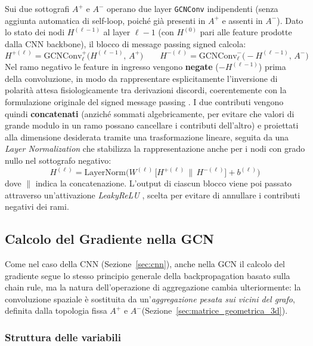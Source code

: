 Sui due sottografi $A^+$ e $A^-$ operano due layer \texttt{GCNConv} \cite{kipfwelling2017} indipendenti (senza aggiunta automatica di self-loop, poiché già presenti in $A^+$ e assenti in $A^-$). Dato lo stato dei nodi $H^{(\ell-1)}$ al layer $\ell-1$ (con $H^{(0)}$ pari alle feature prodotte dalla CNN backbone), il blocco di message passing signed calcola:
\begin{equation}
	H^{+(\ell)} = \text{GCNConv}^+_\ell\big(H^{(\ell-1)},\, A^+\big)
	\qquad
	H^{-(\ell)} = \text{GCNConv}^-_\ell\big(-H^{(\ell-1)},\, A^-\big)
\end{equation}
Nel ramo negativo le feature in ingresso vengono \textbf{negate} ($-H^{(\ell-1)}$) prima della convoluzione, in modo da rappresentare esplicitamente l'inversione di polarità attesa fisiologicamente tra derivazioni discordi, coerentemente con la formulazione originale del signed message passing \cite{derr2018signed}. I due contributi vengono quindi \textbf{concatenati} (anziché sommati algebricamente, per evitare che valori di grande modulo in un ramo possano cancellare i contributi dell'altro) e proiettati alla dimensione desiderata tramite una trasformazione lineare, seguita da una \textit{Layer Normalization} \cite{ba2016layernorm} che stabilizza la rappresentazione anche per i nodi con grado nullo nel sottografo negativo:
\begin{equation}
	H^{(\ell)} = \text{LayerNorm}\Big(W^{(\ell)}\,\big[H^{+(\ell)} \,\|\, H^{-(\ell)}\big] + b^{(\ell)}\Big)
\end{equation}
dove $\|$ indica la concatenazione. L'output di ciascun blocco viene poi passato attraverso un'attivazione \emph{LeakyReLU} \cite{maas2013rectifier}, scelta per evitare di annullare i contributi negativi dei rami.

\subsection{Calcolo del Gradiente nella GCN}
\label{sec:gcn_gradient}

Come nel caso della CNN (Sezione~\ref{sec:cnn}), anche nella GCN il calcolo del gradiente segue lo stesso principio generale della backpropagation basato sulla chain rule, ma la natura dell'operazione di aggregazione cambia ulteriormente: la convoluzione spaziale è sostituita da un'\emph{aggregazione pesata sui vicini del grafo}, definita dalla topologia fissa $A^+$ e $A^-$(Sezione~\ref{sec:matrice_geometrica_3d}).

\subsubsection{Struttura delle variabili}

